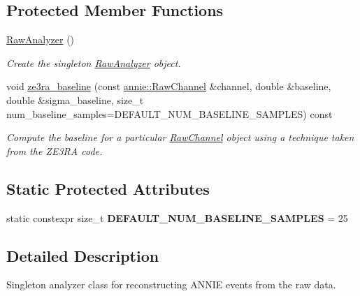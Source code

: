 \subsection*{Protected Member Functions}
\begin{DoxyCompactItemize}
\item 
\hypertarget{classannie_1_1RawAnalyzer_abf612bfdacdea2908e138016e2eb0080}{
\hyperlink{classannie_1_1RawAnalyzer_abf612bfdacdea2908e138016e2eb0080}{RawAnalyzer} ()}
\label{classannie_1_1RawAnalyzer_abf612bfdacdea2908e138016e2eb0080}

\begin{DoxyCompactList}\small\item\em Create the singleton \hyperlink{classannie_1_1RawAnalyzer}{RawAnalyzer} object. \item\end{DoxyCompactList}\item 
void \hyperlink{classannie_1_1RawAnalyzer_a33d2f06b95aa38e099d735809a80c085}{ze3ra\_\-baseline} (const \hyperlink{classannie_1_1RawChannel}{annie::RawChannel} \&channel, double \&baseline, double \&sigma\_\-baseline, size\_\-t num\_\-baseline\_\-samples=DEFAULT\_\-NUM\_\-BASELINE\_\-SAMPLES) const 
\begin{DoxyCompactList}\small\item\em Compute the baseline for a particular \hyperlink{classannie_1_1RawChannel}{RawChannel} object using a technique taken from the ZE3RA code. \item\end{DoxyCompactList}\end{DoxyCompactItemize}
\subsection*{Static Protected Attributes}
\begin{DoxyCompactItemize}
\item 
\hypertarget{classannie_1_1RawAnalyzer_af2922e3755357bc385d3bb0698927da8}{
static constexpr size\_\-t {\bfseries DEFAULT\_\-NUM\_\-BASELINE\_\-SAMPLES} = 25}
\label{classannie_1_1RawAnalyzer_af2922e3755357bc385d3bb0698927da8}

\end{DoxyCompactItemize}


\subsection{Detailed Description}
Singleton analyzer class for reconstructing ANNIE events from the raw data. 


